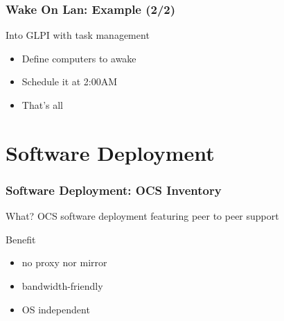 \documentclass{beamer}
\begin{document}
\begin{frame}
    \frametitle{Wake On Lan: Example (2/2)}


    \begin{block}{Into GLPI with task management}
    \begin{itemize}
    \item Define computers to awake
    \item Schedule it at 2:00AM
    \item That's all
    \end{itemize}
    \end{block}

\end{frame}

\section{Software Deployment}

\begin{frame}
    \frametitle{Software Deployment: OCS Inventory}

    \begin{block}{What?}
    OCS software deployment featuring peer to peer support
    \end{block}

    \begin{block}{Benefit}
    \begin{itemize}
        \item no proxy nor mirror
        \item bandwidth-friendly
        \item OS independent
    \end{itemize}
    \end{block}
\end{frame}
\end{document}
